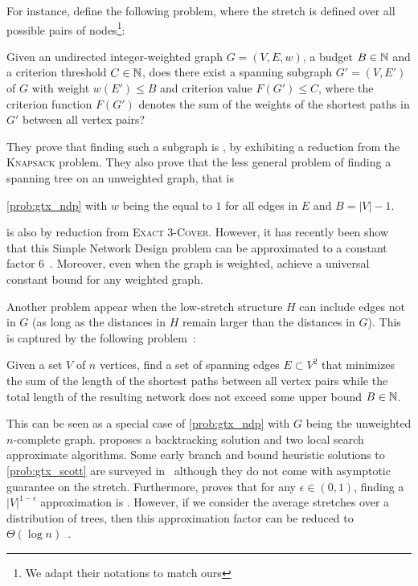 For instance, \textcite{Johnson1978} define the following problem, where the stretch is defined over
all possible pairs of nodes\footnote{We adapt their notations
to match ours}:  
\begin{problem}
  \label{prob:gtx_ndp}
  Given an undirected integer-weighted graph $G=(V, E, w)$, a budget $B\in\mathbb{N}$ and a criterion
  threshold $C\in \mathbb{N}$, does there exist a spanning subgraph $G'=(V, E')$ of $G$ with weight
  $w(E') \leq B$ and criterion value $F(G') \leq C$, where the criterion function $F(G')$ denotes
  the sum of the weights of the shortest paths in $G'$ between all vertex pairs?
\end{problem}
They prove that finding such a subgraph is \NPc{}, by exhibiting a reduction from the
\textsc{Knapsack} problem. They also prove that the less general problem of finding a spanning tree
on an unweighted graph, that is
\vspace{-.5\baselineskip}
\begin{problem}
  \autoref{prob:gtx_ndp} with $w$ being the equal to $1$ for all edges in $E$ and $B=|V|-1$.
\end{problem}%
\vspace{-.5\baselineskip}
\noindent is also \NPc{} by reduction from \textsc{Exact 3-Cover}.
However, it has recently been show that this Simple Network Design problem can be approximated to a
constant factor $6$~\autocite{AllPairStrech10}. Moreover, even when the graph is weighted,
\textcite{constantDistortion07} achieve a universal constant bound for any weighted graph.

Another problem appear when the low-stretch structure $H$ can include edges not in $G$ (as long as
the distances in $H$ remain larger than the distances in $G$). This is captured by the following
problem~\autocite{OptimalNetwork69}:
\begin{problem}
  \label{prob:gtx_scott}
  Given a set $V$ of $n$ vertices, find a set of spanning edges $E\subset V^2$ that minimizes
  the sum of the length of the shortest paths  between all vertex pairs while the
  total length of the resulting network does not exceed some upper bound $B\in\mathbb{N}$.
\end{problem}
This can be seen as a special case of \autoref{prob:gtx_ndp} with $G$ being the unweighted
$n$-complete graph. \Textcite{OptimalNetwork69} proposes a backtracking solution and two local search approximate
algorithms. Some early branch and bound heuristic solutions to \autoref{prob:gtx_scott} are surveyed
in~\autocite[Section 2.3.2]{networkDesignSurvey89} although they do not come with asymptotic
guarantee on the stretch. Furthermore, \textcite{optimApproxNP80} proves that for any $\epsilon \in
(0,1)$, finding a $|V|^{1-\epsilon}$ approximation is \NPc{}.
However, if we consider the average stretches over a distribution of trees, then this approximation
factor can be reduced to $\Theta(\log n)$~\autocite{lognMetricBoundConf03}.

